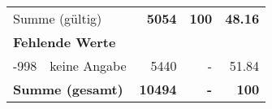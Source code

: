 \begin{longtable}{lXrrr}
     \midrule
     \multicolumn{2}{l}{Summe (gültig)} &
       \textbf{\num{5054}} &
     \textbf{100} &
       \textbf{\num[round-mode=places,round-precision=2]{48,16}} \\
     \multicolumn{5}{l}{\textbf{Fehlende Werte}}\\
       -998 &
       keine Angabe &
         \num{5440} &
        - &
         \num[round-mode=places,round-precision=2]{51,84} \\
     \midrule
     \multicolumn{2}{l}{\textbf{Summe (gesamt)}} &
          \textbf{\num{10494}} &
        \textbf{-} &
        \textbf{100} \\
     \bottomrule
     \end{longtable}
     
